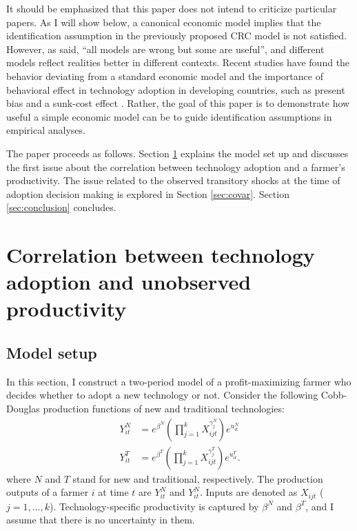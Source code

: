 \documentclass[11pt,letterpaper]{article}
\begin{document}
It should be emphasized that this paper does not intend to criticize particular papers.
As I will show below, a canonical economic model implies that the identification assumption in the previously proposed CRC model is not satisfied.
However, as said, ``all models are wrong but some are useful'', and different models reflect realities better in different contexts.
Recent studies have found the behavior deviating from a standard economic model and the importance of behavioral effect in technology adoption in developing countries, such as present bias \citep{duflo2011nudging} and a sunk-cost effect \citep{ashraf2010can}.
Rather, the goal of this paper is to demonstrate how useful a simple economic model can be to guide identification assumptions in empirical analyses.

The paper proceeds as follows.
Section \ref{sec:tau} explains the model set up and discusses the first issue about the correlation between technology adoption and a farmer's productivity.
The issue related to the observed transitory shocks at the time of adoption decision making is explored in Section \ref{sec:covar}.
Section \ref{sec:conclusion} concludes.

\section{Correlation between technology adoption and unobserved productivity}\label{sec:tau}
\subsection{Model setup}

In this section, I construct a two-period model of a profit-maximizing farmer who decides whether to adopt a new technology or not.
Consider the following Cobb-Douglas production functions of new and traditional technologies:
\begin{align*}
  Y_{it}^N &= e^{\beta^N} \left(\prod_{j=1}^k X_{ijt}^{\gamma_j^N} \right) e^{u_{it}^N} \\
  Y_{it}^T &= e^{\beta^T} \left(\prod_{j=1}^k X_{ijt}^{\gamma_j^T} \right) e^{u_{it}^T}.
\end{align*}
where $N$ and $T$ stand for new and traditional, respectively.
The production outputs of a farmer $i$ at time $t$ are $Y_{it}^N$ and $Y_{it}^N$.
Inputs are denoted as $X_{ijt}$ ($j = 1, \dots, k$).
Technology-specific productivity is captured by $\beta^N$ and $\beta^T$, and I assume that there is no uncertainty in them.
\end{document}
